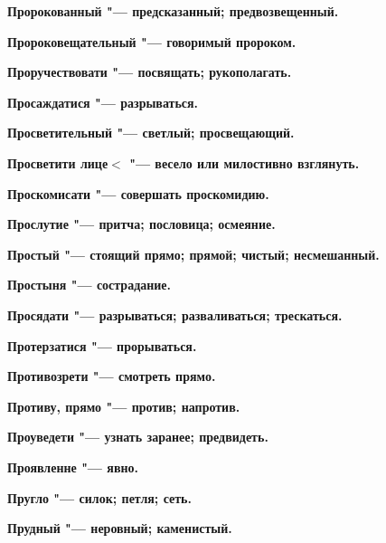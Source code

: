\bfseries Пророкованный \normalfont{} "--- предсказанный; предвозвещенный. 




\bfseries Пророковещательный \normalfont{} "--- говоримый пророком. 




\bfseries Проручествовати \normalfont{} "--- посвящать; рукополагать. 




\bfseries Просаждатися \normalfont{} "--- разрываться. 




\bfseries Просветительный \normalfont{} "--- светлый; просвещающий. 




\bfseries Просветити лице$<$ \normalfont{} "--- весело или милостивно взглянуть. 




\bfseries Проскомисати \normalfont{} "--- совершать проскомидию. 




\bfseries Прослутие \normalfont{} "--- притча; пословица; осмеяние. 




\bfseries Простый \normalfont{} "--- стоящий прямо; прямой; чистый; несмешанный. 




\bfseries Простыня \normalfont{} "--- сострадание. 




\bfseries Просядати \normalfont{} "--- разрываться; разваливаться; трескаться. 




\bfseries Протерзатися \normalfont{} "--- прорываться. 




\bfseries Противозрети \normalfont{} "--- смотреть прямо. 




\bfseries Противу, прямо \normalfont{} "--- против; напротив. 




\bfseries Проуведети \normalfont{} "--- узнать заранее; предвидеть. 




\bfseries Проявленне \normalfont{} "--- явно. 




\bfseries Пругло \normalfont{} "--- силок; петля; сеть. 




\bfseries Прудный \normalfont{} "--- неровный; каменистый. 




